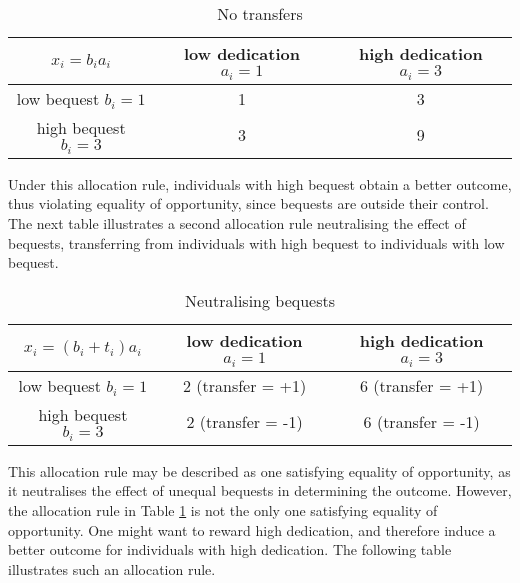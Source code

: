 \begin{table}[H]
	\caption{No transfers}
	\begin{center}
		\begin{tabular}{ |c|cc| }
			\hline
			\( x_i = b_i a_i \)        & low dedication \( a_i = 1 \) & high dedication \( a_i = 3 \) \\
			\hline
			low bequest \( b_i = 1 \)  & 1                            & 3                             \\
			high bequest \( b_i = 3 \) & 3                            & 9                             \\
			\hline
		\end{tabular}
	\end{center}
\end{table}

Under this allocation rule, individuals with high bequest obtain a better outcome, thus violating equality of opportunity, since bequests are outside their control. The next table illustrates a second allocation rule neutralising the effect of bequests, transferring from individuals with high bequest to individuals with low bequest.

\begin{table}[H]
	\caption{Neutralising bequests}
	\label{tb:eq}
	\begin{center}
		\begin{tabular}{ |c|cc| }
			\hline
			\( x_i = ( b_i + t_i )a_i \) & low dedication \( a_i = 1 \) & high dedication \( a_i = 3 \) \\
			\hline
			low bequest \( b_i = 1 \)    & 2 (transfer = +1)            & 6     (transfer = +1)         \\
			high bequest \( b_i = 3 \)   & 2   (transfer = -1)          & 6    (transfer = -1)          \\
			\hline
		\end{tabular}
	\end{center}
\end{table}

This allocation rule may be described as one satisfying equality of opportunity, as it neutralises the effect of unequal bequests in determining the outcome. However, the allocation rule in Table \ref{tb:eq} is not the only one satisfying equality of opportunity. One might want to reward high dedication, and therefore induce a better outcome for individuals with high dedication. The following table illustrates such an allocation rule.

